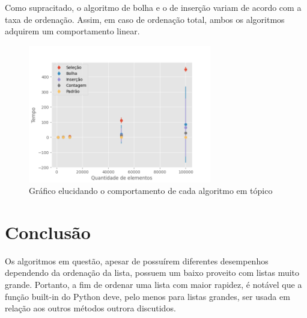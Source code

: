 \documentclass[10pt,a4paper]{article}
\begin{document}
Como supracitado, o algoritmo de bolha e o de inserção variam de acordo com a taxa de ordenação. Assim, em caso de ordenação total, ambos os algoritmos adquirem um comportamento linear.
\begin{figure}[h]
    \includegraphics[width=8cm]{sizes.png}
    \caption{Gráfico elucidando o comportamento de cada algoritmo em tópico}
    \end{figure}



\section*{Conclusão}
Os algoritmos em questão, apesar de possuírem diferentes desempenhos dependendo da ordenação da lista, possuem um baixo proveito com listas muito grande. Portanto, a fim de ordenar uma lista com maior rapidez, é notável que a função built-in do Python deve, pelo menos para listas grandes, ser usada em relação aos outros métodos outrora discutidos.
\end{document}
